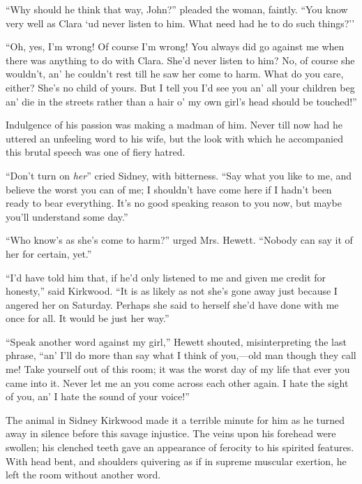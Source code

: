``Why should he think that way, John?'' pleaded the woman, faintly.
``You know very well as Clara `ud never listen to him. What need had he
to do such things?''

``Oh, yes, I'm wrong! Of course I'm wrong! You always did go against me
when there was anything to do with Clara. She'd never listen to him? No,
of course she wouldn't, an' he couldn't rest till he saw her come to
harm. What do you care, either? She's no child of yours. But I tell you
I'd see you an' all your children beg an' die in the streets rather than
a hair o' my own girl's head should be touched!''

Indulgence of his passion was making a madman of him. Never till now had
he uttered an unfeeling word to his wife, but the look with which he
accompanied this brutal speech was one of fiery hatred.

``Don't turn on \emph{her}'' cried Sidney, with bitterness. ``Say what
you like to me, and {\protect\hypertarget{287}{}{}}believe the worst you
can of me; I shouldn't have come here if I hadn't been ready to bear
everything. It's no good speaking reason to you now, but maybe you'll
understand some day.''

``Who know's as she's come to harm?'' urged Mrs. Hewett. ``Nobody can
say it of her for certain, yet.''

``I'd have told him that, if he'd only listened to me and given me
credit for honesty,'' said Kirkwood. ``It is as likely as not she's gone
away just because I angered her on Saturday. Perhaps she said to herself
she'd have done with me once for all. It would be just her way.''

``Speak another word against my girl,'' Hewett shouted, misinterpreting
the last phrase, ``an' I'll do more than say what I think of you,---old
man though they call me! Take yourself out of this room; it was the
worst day of my life that ever you came into it. Never let me an you
come across each other again. I hate the sight of you, an' I hate the
sound of your voice!''

{\protect\hypertarget{288}{}{}}The animal in Sidney Kirkwood made it a
terrible minute for him as he turned away in silence before this savage
injustice. The veins upon his forehead were swollen; his clenched teeth
gave an appearance of ferocity to his spirited features. With head bent,
and shoulders quivering as if in supreme muscular exertion, he left the
room without another word.

